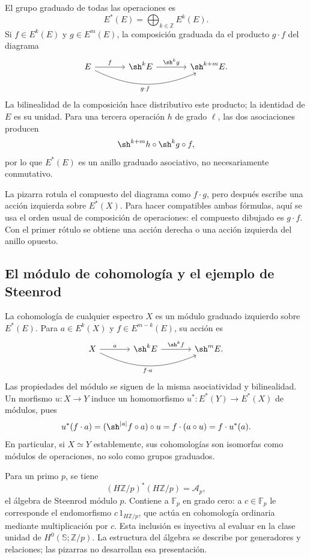 El grupo graduado de todas las operaciones es
\[
E^*(E)=\bigoplus_{k\in\mathbb Z}E^k(E).
\]
Si $f\in E^k(E)$ y $g\in E^m(E)$, la composición graduada da el producto $g\cdot f$ del diagrama
\[
\begin{tikzcd}[column sep=large]
E\arrow[r,"f"]\arrow[rr,bend right=25,"g\cdot f"']
&\sh^kE\arrow[r,"\sh^kg"]&\sh^{k+m}E.
\end{tikzcd}
\]
La bilinealidad de la composición hace distributivo este producto; la identidad de $E$ es su unidad. Para una tercera operación $h$ de grado $\ell$, las dos asociaciones producen
\[
\sh^{k+m}h\circ\sh^kg\circ f,
\]
por lo que $E^*(E)$ es un anillo graduado asociativo, no necesariamente conmutativo.

\begin{nota}
La pizarra rotula el compuesto del diagrama como $f\cdot g$, pero después escribe una acción izquierda sobre $E^*(X)$. Para hacer compatibles ambas fórmulas, aquí se usa el orden usual de composición de operaciones: el compuesto dibujado es $g\cdot f$. Con el primer rótulo se obtiene una acción derecha o una acción izquierda del anillo opuesto.
\end{nota}

\subsection{El módulo de cohomología y el ejemplo de Steenrod}
La cohomología de cualquier espectro $X$ es un módulo graduado izquierdo sobre $E^*(E)$. Para $a\in E^k(X)$ y $f\in E^{m-k}(E)$, su acción es
\[
\begin{tikzcd}[column sep=large]
X\arrow[r,"a"]\arrow[rr,bend right=25,"f\cdot a"']
&\sh^kE\arrow[r,"\sh^kf"]&\sh^mE.
\end{tikzcd}
\]
Las propiedades del módulo se siguen de la misma asociatividad y bilinealidad. Un morfismo $u\colon X\to Y$ induce un homomorfismo $u^*\colon E^*(Y)\to E^*(X)$ de módulos, pues
\[
u^*(f\cdot a)=(\sh^{|a|}f\circ a)\circ u
=f\cdot(a\circ u)=f\cdot u^*(a).
\]
En particular, si $X\simeq Y$ establemente, sus cohomologías son isomorfas como módulos de operaciones, no solo como grupos graduados.

Para un primo $p$, se tiene
\[
(H\mathbb Z/p)^*(H\mathbb Z/p)=\mathcal A_p,
\]
el álgebra de Steenrod módulo $p$. Contiene a $\mathbb F_p$ en grado cero: a $c\in\mathbb F_p$ le corresponde el endomorfismo $c\,1_{H\mathbb Z/p}$, que actúa en cohomología ordinaria mediante multiplicación por $c$. Esta inclusión es inyectiva al evaluar en la clase unidad de $H^0(\mathbb S;\mathbb Z/p)$. La estructura del álgebra se describe por generadores y relaciones; las pizarras no desarrollan esa presentación.

